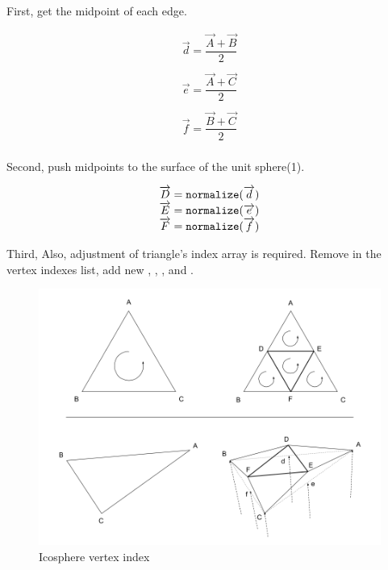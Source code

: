 First, get the midpoint of each edge.

\[
\begin{array}{lr}
\overrightarrow{d} = \dfrac{\overrightarrow{A} + \overrightarrow{B}}{2}\\\\
\overrightarrow{e} = \dfrac{\overrightarrow{A} + \overrightarrow{C}}{2}\\\\
\overrightarrow{f} = \dfrac{\overrightarrow{B} + \overrightarrow{C}}{2}\\
\end{array}
\]

Second, push midpoints to the surface of the unit sphere(1).

\[
\begin{array}{lr}
\overrightarrow{D} = \texttt{normalize}(\overrightarrow{d})\\
\overrightarrow{E} = \texttt{normalize}(\overrightarrow{e})\\
\overrightarrow{F} = \texttt{normalize}(\overrightarrow{f})\\
\end{array}
\]

Third, Also, adjustment of triangle's index array is required. Remove  in the vertex indexes list, add new , , , and .

\begin{figure}[H]
\caption{Icosphere vertex index}
\label{fig:icosphere-vertex-index}
\centering
\includegraphics[width=\textwidth, keepaspectratio]{Figures/icosphere-vertex-index.png}
\decoRule
\end{figure}

